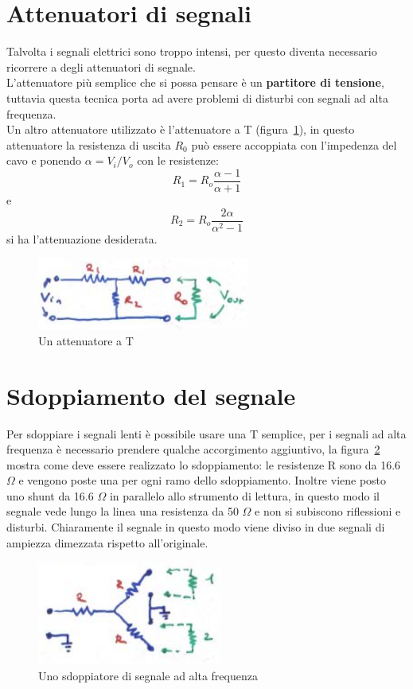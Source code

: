 \section{Attenuatori di segnali}
Talvolta i segnali elettrici sono troppo intensi, per questo diventa necessario ricorrere a degli attenuatori di segnale.\\
L'attenuatore pi\`u semplice che si possa pensare \`e un \textbf{partitore di tensione}, tuttavia questa tecnica porta ad avere problemi
di disturbi con segnali ad alta frequenza.\\
Un altro attenuatore utilizzato \`e l'attenuatore a T (figura~\ref{fig:attenuatoreT}), in questo attenuatore la resistenza di uscita $R_0$
pu\`o essere accoppiata con l'impedenza del cavo e ponendo $\alpha=V_i/V_o$  con le resistenze:
\begin{equation*}
R_1 = R_o \frac{\alpha - 1}{\alpha + 1}
\end{equation*}
e
\begin{equation*}
R_2 = R_o \frac{2 \alpha}{\alpha^2 - 1}
\end{equation*}
si ha l'attenuazione desiderata.
\begin{figure}[htbp]
\begin{center}
\includegraphics[scale=1]{./Immagini/AttenutatoreT.png}
\caption{Un attenuatore a T}
\label{fig:attenuatoreT}
\end{center}
\end{figure}
\section{Sdoppiamento del segnale}
Per sdoppiare i segnali lenti \`e possibile usare una T semplice, per i segnali ad alta frequenza \`e necessario prendere qualche accorgimento
aggiuntivo, la figura~\ref{fig:sdoppiatore} mostra come deve essere realizzato lo sdoppiamento:
le resistenze R sono da 16.6 $\Omega$ e vengono poste una per ogni ramo dello sdoppiamento.
Inoltre viene posto uno shunt da 16.6 $\Omega$ in parallelo allo strumento di lettura, 
in questo modo il segnale vede lungo la linea una resistenza da 50 $\Omega$ e non si subiscono riflessioni e disturbi.
Chiaramente il segnale in questo modo viene diviso in due segnali di ampiezza dimezzata rispetto all'originale.
\begin{figure}[htbp]
\begin{center}
	\includegraphics{./Immagini/Sdoppiatore.png}
\caption{Uno sdoppiatore di segnale ad alta frequenza}
\label{fig:sdoppiatore}
\end{center}
\end{figure}
